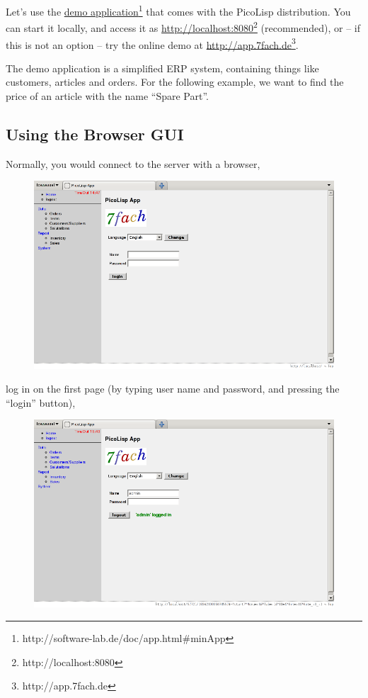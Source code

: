 Let's use the \underline{demo application}\footnote{http://software-lab.de/doc/app.html\#minApp}
that comes with the PicoLisp distribution. You can start it locally, and access
it as \underline{http://localhost:8080}\footnote{http://localhost:8080} (recommended), or -- if this is not an option --
try the online demo at \underline{http://app.7fach.de}\footnote{http://app.7fach.de}.

The demo application is a simplified ERP system, containing things like
customers, articles and orders. For the following example, we want to find the
price of an article with the name ``Spare Part''.

\subsection{Using the Browser GUI}
\label{sec:gui-script-using-the-browser-gui}

Normally, you would connect to the server with a browser,

\begin{figure}[H]
\centering
\includegraphics[scale=.4]{graphics/gui-script1.jpg}
\end{figure}


log in on the first page (by typing user name and password, and pressing the
``login'' button),

\begin{figure}[H]
\centering
\includegraphics[scale=.4]{graphics/gui-script2.jpg}
\end{figure}


